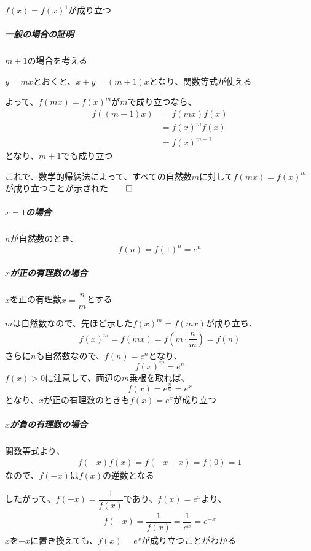 \documentclass[../book_jiriki_calc]{subfiles}
\begin{document}
$f(x)=f(x)^1$が成り立つ

\br

\subparagraph{一般の場合の証明}

$m+1$の場合を考える

$y=mx$とおくと、$x+y=(m+1)x$となり、関数等式が使える

よって、$f(mx) = f(x)^m$が$m$で成り立つなら、
\begin{align}
  f((m+1)x) & = f(mx)f(x)   \\
            & = f(x)^m f(x) \\
            & = f(x)^{m+1}
\end{align}
となり、$m+1$でも成り立つ

これで、数学的帰納法によって、すべての自然数$m$に対して$f(mx)=f(x)^m$が成り立つことが示された$\qed$

\sectionline

\subparagraph{$x=1$の場合}

$n$が自然数のとき、
\begin{equation}
  f(n) = f(1)^n = e^n
\end{equation}

\subparagraph{$x$が正の有理数の場合}

$x$を正の有理数$x=\dfrac{n}{m}$とする

$m$は自然数なので、先ほど示した$f(x)^m = f(mx)$が成り立ち、
\begin{align}
  f(x)^m = f(mx) = f\left(m\cdot\dfrac{n}{m}\right) = f(n)
\end{align}
さらに$n$も自然数なので、$f(n) = e^n$となり、
\begin{equation}
  f(x)^m = e^n
\end{equation}
$f(x) > 0$に注意して、両辺の$m$乗根を取れば、
\begin{equation}
  f(x) = e^{\frac{n}{m}} = e^x
\end{equation}
となり、$x$が正の有理数のときも$f(x)=e^x$が成り立つ

\subparagraph{$x$が負の有理数の場合}

関数等式より、
\begin{align}
  f(-x)f(x) = f(-x+x) = f(0) = 1
\end{align}
なので、$f(-x)$は$f(x)$の逆数となる

したがって、$f(-x)=\dfrac{1}{f(x)}$であり、$f(x)=e^x$より、
\begin{align}
  f(-x) = \dfrac{1}{f(x)} = \dfrac{1}{e^x} = e^{-x}
\end{align}
$x$を$-x$に置き換えても、$f(x)=e^x$が成り立つことがわかる
\end{document}
